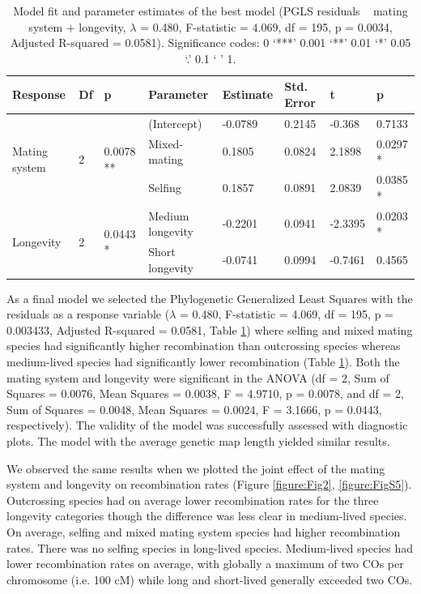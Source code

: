 \documentclass{article}
\begin{document}
\begin{table}[h!]
\centering{}
\caption{Model fit and parameter estimates of the best model (PGLS residuals ~ mating system + longevity, $\lambda$ = 0.480, F-statistic = 4.069, df = 195, p = 0.0034, Adjusted R-squared = 0.0581). Significance codes: 0 ‘***’ 0.001 ‘**’ 0.01 ‘*’ 0.05 ‘.’ 0.1 ‘ ’ 1.}
\begin{tabular}{llllllll}
Response                       & Df                 & p                       & Parameter        & Estimate & Std. Error & t       & p      \\ \hline
\multirow{3}{*}{Mating system} & \multirow{3}{*}{2} & \multirow{3}{*}{0.0078 **} & (Intercept)      & -0.0789  & 0.2145     & -0.368  & 0.7133 \\ \cline{4-8} 
                               &                    &                         & Mixed-mating     & 0.1805   & 0.0824     & 2.1898  & 0.0297 * \\
                               &                    &                         & Selfing          & 0.1857   & 0.0891     & 2.0839  & 0.0385 * \\ \cline{4-8} 
\multirow{2}{*}{Longevity}     & \multirow{2}{*}{2} & \multirow{2}{*}{0.0443 *} & Medium longevity & -0.2201  & 0.0941     & -2.3395 & 0.0203 * \\
                               &                    &                         & Short longevity  & -0.0741  & 0.0994     & -0.7461 & 0.4565
\end{tabular}
\label{table:table2}
\end{table}


As a final model we selected the Phylogenetic Generalized Least Squares with the residuals as a response variable ($\lambda$ = 0.480, F-statistic = 4.069, df = 195, p = 0.003433, Adjusted R-squared = 0.0581, Table \ref{table:table2}) where selfing and mixed mating species had significantly higher recombination than outcrossing species whereas medium-lived species had significantly lower recombination (Table \ref{table:table2}). Both the mating system and longevity were significant in the ANOVA (df = 2, Sum of Squares = 0.0076, Mean Squares = 0.0038, F = 4.9710, p = 0.0078, and df = 2, Sum of Squares = 0.0048, Mean Squares = 0.0024, F = 3.1666, p = 0.0443, respectively). The validity of the model was successfully assessed with diagnostic plots. The model with the average genetic map length yielded similar results.


We observed the same results when we plotted the joint effect of the mating system and longevity on recombination rates (Figure \ref{figure:Fig2}, \ref{figure:FigS5}). Outcrossing species had on average lower recombination rates for the three longevity categories though the difference was less clear in medium-lived species. On average, selfing and mixed mating system species had higher recombination rates. There was no selfing species in long-lived species. Medium-lived species had lower recombination rates on average, with globally a maximum of two COs per chromosome (i.e. 100 cM) while long and short-lived generally exceeded two COs.
\end{document}
